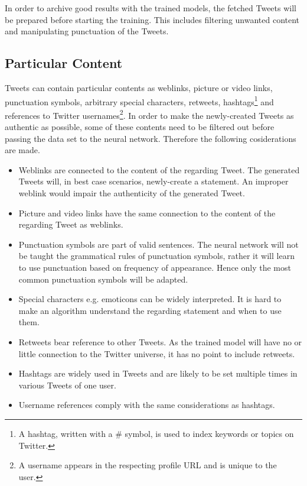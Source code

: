 \documentclass[conference]{IEEEtran}
\begin{document}
In order to archive good results with the trained models, the fetched Tweets will be prepared before starting the training. This includes filtering unwanted content and manipulating punctuation of the Tweets. 

\subsection{Particular Content}\label{subsec_particular_content}

Tweets can contain particular contents as weblinks, picture or video links, punctuation symbols, arbitrary special characters, retweets, hashtags\footnote{A hashtag, written with a \# symbol, is used to index keywords or topics on Twitter.} and references to Twitter usernames\footnote{A username appears in the respecting profile URL and is unique to the user.}. In order to make the newly-created Tweets as authentic as possible, some of these contents need to be filtered out before passing the data set to the neural network. Therefore the following cosiderations are made.\\

\begin{itemize}
\item Weblinks are connected to the content of the regarding Tweet. The generated Tweets will, in best case scenarios, newly-create a statement. An improper weblink would impair the authenticity of the generated Tweet.
\item Picture and video links have the same connection to the content of the regarding Tweet as weblinks.
\item Punctuation symbols are part of valid sentences. The neural network will not be taught the grammatical rules of punctuation symbols, rather it will learn to use punctuation based on frequency of appearance. Hence only the most common punctuation symbols will be adapted.
\item Special characters e.g. emoticons can be widely interpreted. It is hard to make an algorithm understand the regarding statement and when to use them. 
\item Retweets bear reference to other Tweets. As the trained model will have no or little connection to the Twitter universe, it has no point to include retweets.
\item Hashtags are widely used in Tweets and are likely to be set multiple times in various Tweets of one user.
\item Username references comply with the same considerations as hashtags.
\end{itemize}
\end{document}
